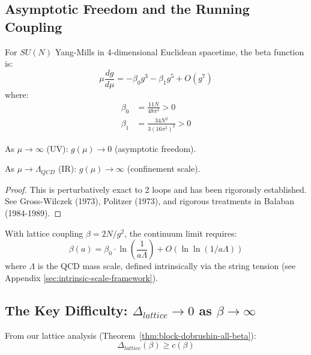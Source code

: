 \subsection{Asymptotic Freedom and the Running Coupling}

\begin{theorem}
\label{thm:asymptotic-freedom}
For $SU(N)$ Yang-Mills in 4-dimensional Euclidean spacetime, the beta function is:
\[
\mu \frac{dg}{d\mu} = -\beta_0 g^3 - \beta_1 g^5 + O(g^7)
\]
where:
\begin{align}
\beta_0 &= \frac{11N}{48\pi^2} > 0 \\
\beta_1 &= \frac{34N^2}{3(16\pi^2)^2} > 0
\end{align}

As $\mu \to \infty$ (UV): $g(\mu) \to 0$ (asymptotic freedom).

As $\mu \to \Lambda_{QCD}$ (IR): $g(\mu) \to \infty$ (confinement scale).
\end{theorem}

\begin{proof}
This is perturbatively exact to 2 loops and has been rigorously established.
See Gross-Wilczek (1973), Politzer (1973), and rigorous treatments in 
Balaban (1984-1989).
\end{proof}

\begin{corollary}
\label{cor:lattice-continuum}
With lattice coupling $\beta = 2N/g^2$, the continuum limit requires:
\[
\beta(a) = \beta_0 \cdot \ln\left(\frac{1}{a\Lambda}\right) + O(\ln\ln(1/a\Lambda))
\]
where $\Lambda$ is the QCD mass scale, defined intrinsically via the string tension (see Appendix \ref{sec:intrinsic-scale-framework}).
\end{corollary}

\subsection{The Key Difficulty: \texorpdfstring{$\Delta_{lattice} \to 0$ as $\beta \to \infty$}{Delta\_lattice to 0 as beta to infinity}}

From our lattice analysis (Theorem~\ref{thm:block-dobrushin-all-beta}):
\[
\Delta_{lattice}(\beta) \geq c(\beta)
\]

